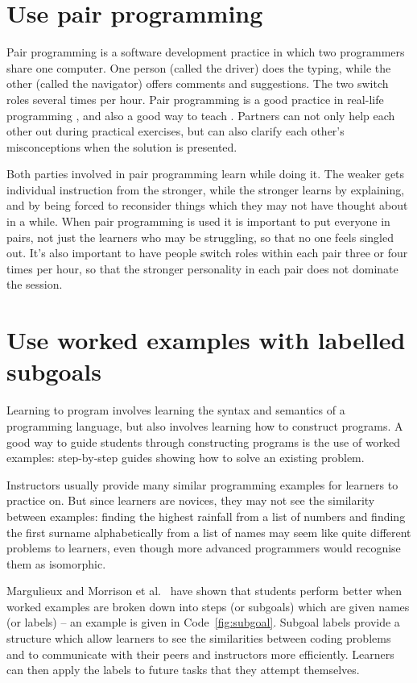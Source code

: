 \documentclass[10pt,letterpaper]{article}
\newcommand{\rulemajor}[2]{\section{#1}\label{#2}}
\newcommand{\evidence}[1]{}
\begin{document}
\rulemajor{Use pair programming}{pair-programming}
\evidence{High}

Pair programming is a software development practice
in which two programmers share one computer.
One person (called the driver) does the typing,
while the other (called the navigator) offers comments and suggestions.
The two switch roles several times per hour.
Pair programming is a good practice in real-life programming \cite{hannay},
and also a good way to teach \cite{mcdowell}.
Partners can not only help each other out during practical exercises,
but can also clarify each other's misconceptions when the solution is presented.

Both parties involved in pair programming learn while doing it.
The weaker gets individual instruction from the stronger,
while the stronger learns by explaining,
and by being forced to reconsider things which they may not have thought about in a while.
When pair programming is used it is important to put everyone in pairs,
not just the learners who may be struggling,
so that no one feels singled out.
It's also important to have people switch roles within each pair three or four times per hour,
so that the stronger personality in each pair does not dominate the session.

\rulemajor{Use worked examples with labelled subgoals}{worked-examples}
\evidence{High}

Learning to program involves learning the syntax and semantics of a programming language,
but also involves learning how to construct programs.
A good way to guide students through constructing programs is the use of worked examples:
step-by-step guides showing how to solve an existing problem.

Instructors usually provide many similar programming examples for learners to practice on.
But since learners are novices,
they may not see the similarity between examples:
finding the highest rainfall from a list of numbers and
finding the first surname alphabetically from a list of names
may seem like quite different problems to learners,
even though more advanced programmers would recognise them as isomorphic.

Margulieux and Morrison et al.~\cite{morrison-subgoals,morrison-parsons,margulieux} have shown that students perform better
when worked examples are broken down into steps (or subgoals)
which are given names (or labels) -- an example is given in Code~\ref{fig:subgoal}.
Subgoal labels provide a structure which allow learners to see the similarities between coding problems and to communicate with their peers and instructors more efficiently.  Learners can then apply the labels to future tasks that they attempt themselves.
\end{document}

